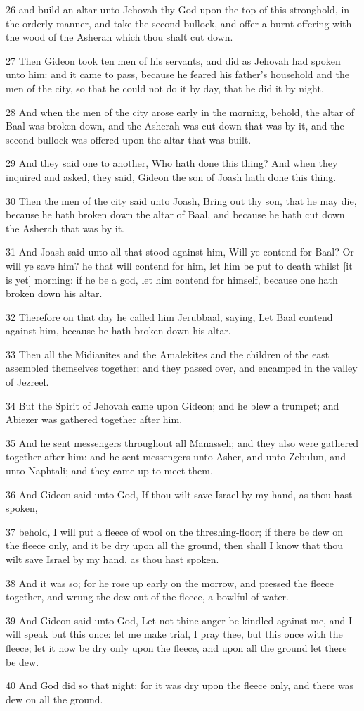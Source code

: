 \par 26 and build an altar unto Jehovah thy God upon the top of this stronghold, in the orderly manner, and take the second bullock, and offer a burnt-offering with the wood of the Asherah which thou shalt cut down.
\par 27 Then Gideon took ten men of his servants, and did as Jehovah had spoken unto him: and it came to pass, because he feared his father's household and the men of the city, so that he could not do it by day, that he did it by night.
\par 28 And when the men of the city arose early in the morning, behold, the altar of Baal was broken down, and the Asherah was cut down that was by it, and the second bullock was offered upon the altar that was built.
\par 29 And they said one to another, Who hath done this thing? And when they inquired and asked, they said, Gideon the son of Joash hath done this thing.
\par 30 Then the men of the city said unto Joash, Bring out thy son, that he may die, because he hath broken down the altar of Baal, and because he hath cut down the Asherah that was by it.
\par 31 And Joash said unto all that stood against him, Will ye contend for Baal? Or will ye save him? he that will contend for him, let him be put to death whilst [it is yet] morning: if he be a god, let him contend for himself, because one hath broken down his altar.
\par 32 Therefore on that day he called him Jerubbaal, saying, Let Baal contend against him, because he hath broken down his altar.
\par 33 Then all the Midianites and the Amalekites and the children of the east assembled themselves together; and they passed over, and encamped in the valley of Jezreel.
\par 34 But the Spirit of Jehovah came upon Gideon; and he blew a trumpet; and Abiezer was gathered together after him.
\par 35 And he sent messengers throughout all Manasseh; and they also were gathered together after him: and he sent messengers unto Asher, and unto Zebulun, and unto Naphtali; and they came up to meet them.
\par 36 And Gideon said unto God, If thou wilt save Israel by my hand, as thou hast spoken,
\par 37 behold, I will put a fleece of wool on the threshing-floor; if there be dew on the fleece only, and it be dry upon all the ground, then shall I know that thou wilt save Israel by my hand, as thou hast spoken.
\par 38 And it was so; for he rose up early on the morrow, and pressed the fleece together, and wrung the dew out of the fleece, a bowlful of water.
\par 39 And Gideon said unto God, Let not thine anger be kindled against me, and I will speak but this once: let me make trial, I pray thee, but this once with the fleece; let it now be dry only upon the fleece, and upon all the ground let there be dew.
\par 40 And God did so that night: for it was dry upon the fleece only, and there was dew on all the ground.

